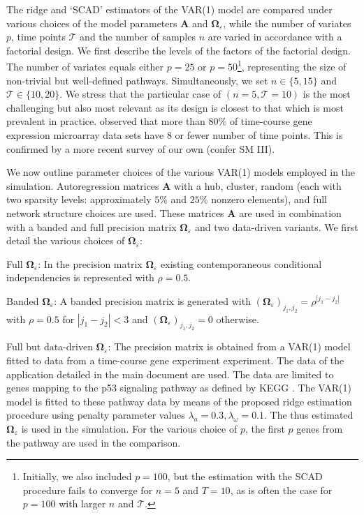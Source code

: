 \documentclass[a4paper]{article}
\begin{document}
The ridge and `SCAD' estimators of the VAR(1) model are compared under various choices of the model parameters $\mathbf{A}$ and $\mathbf{\Omega}_{\varepsilon}$, while the number of variates $p$, time points $\mathcal{T}$ and the number of samples $n$ are varied in accordance with a factorial design. We first describe the levels of the factors of the factorial design. The number of variates equals either $p=25$ or $p=50$\footnote{Initially, we also included $p=100$, but the estimation with the SCAD procedure fails to converge for $n=5$ and $T=10$, as is often the case for $p=100$ with larger $n$ and $\mathcal{T}$.}, representing the size of non-trivial but well-defined pathways. Simultaneously, we set $n \in \{5, 15\}$ and $\mathcal{T} \in \{10, 20\}$. We stress that the particular case of $(n=5, \mathcal{T}=10)$ is the most challenging but also most relevant as its design is closest to that which is most prevalent in practice. \cite{Ernst2005} observed that more than $80\%$ of time-course gene expression microarray data sets have 8 or fewer number of time points. This is confirmed by a more recent survey of our own (confer SM III).

We now outline parameter choices of the various VAR(1) models employed in the simulation. Autoregression matrices $\mathbf{A}$ with a hub, cluster, random (each with two sparsity levels: approximately $5\%$ and $25\%$ nonzero elements), and full network structure choices are used. These matrices $\mathbf{A}$ are used in combination with a banded and full precision matrix $\mathbf{\Omega}_{\varepsilon}$ and two data-driven variants. We first detail the various choices of $\mathbf{\Omega}_{\varepsilon}$:
\begin{compactitem}
\item Full $\mathbf{\Omega}_{\varepsilon}$: In the precision matrix $\mathbf{\Omega}_{\varepsilon}$ existing contemporaneous conditional independencies is represented with $\rho=0.5$.

\item Banded $\mathbf{\Omega}_{\varepsilon}$: A banded precision matrix is generated with $(\mathbf{\Omega}_{\varepsilon})_{j_1, j_2} = \rho^{|j_1-j_2|}$ with $\rho=0.5$ for $|j_1-j_2|<3$ and $(\mathbf{\Omega}_{\varepsilon})_{j_1, j_2} = 0$ otherwise.

\item Full but data-driven $\mathbf{\Omega}_{\varepsilon}$: The precision matrix is obtained from a VAR(1) model fitted to data from a time-course gene experiment experiment. The data of the application detailed in the main document are used. The data are limited to genes mapping to the p53 signaling pathway as defined by KEGG \citep{Oga1999}. The VAR(1) model is fitted to these pathway data by means of the proposed ridge estimation procedure using penalty parameter values $\lambda_a=0.3, \lambda_{\omega}=0.1$. The thus estimated $\boldsymbol{\Omega}_{\varepsilon}$ is used in the simulation. For the various choice of $p$, the first $p$ genes from the pathway are used in the comparison.
\end{compactitem}
\end{document}
